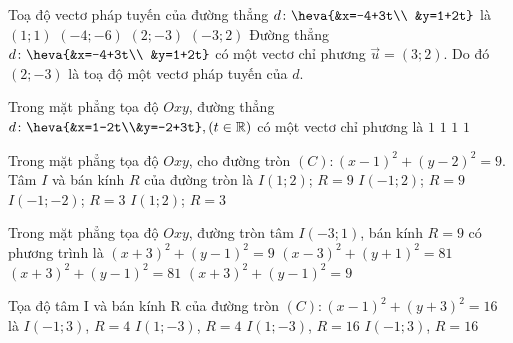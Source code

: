 \begin{ex}%
Toạ độ vectơ pháp tuyến của đường thẳng $d\colon \heva{&x=-4+3t\\ &y=1+2t}$ là
\choice
{$(1;1)$}
{$(-4;-6)$}
{\True $(2;-3)$}
{$(-3;2)$}
\loigiai
{
Đường thẳng $d\colon \heva{&x=-4+3t\\ &y=1+2t}$ có một vectơ chỉ phương $\vec{u}=(3;2)$. Do đó $(2;-3)$ là toạ độ một vectơ pháp tuyến của $d$.
}
\end{ex}

\begin{ex}%
Trong mặt phẳng tọa độ $Oxy$, đường thẳng $d\colon \heva{&x=1-2t\\&y=-2+3t},(t \in \mathbb{R})$ có một vectơ chỉ phương là
\choice
{$1$}
{\True $1$}
{$1$}
{$1$}
\end{ex}

\begin{ex}%
Trong mặt phẳng tọa độ $Oxy$, cho đường tròn $(C)\colon (x-1)^2+(y-2)^2=9$. Tâm $I$ và bán kính $R$ của đường tròn là
\choice
{$I(1;2)$; $R=9$}
{$I(-1;2)$; $R=9$}
{$I(-1;-2)$; $R=3$}
{\True $I(1;2)$; $R=3$}
\end{ex}

\begin{ex}%
Trong mặt phẳng tọa độ $Oxy$, đường tròn tâm $I\left(-3;1\right)$, bán kính $R=9$ có phương trình là
\choice
{$\left(x+3\right)^2+\left(y-1\right)^2=9$}
{$\left(x-3\right)^2+\left(y+1\right)^2=81$}
{\True $\left(x+3\right)^2+\left(y-1\right)^2=81$}
{$\left(x+3\right)^2+\left(y-1\right)^2=9$}
\end{ex}

\begin{ex}%
Tọa độ tâm I và bán kính R của đường tròn $(C)\colon {\left(x-1\right)^2}+\left(y+3\right)^2=16$ là
\choice
{$I\left(-1;3\right)$, $R=4$}
{\True $I\left(1;-3\right)$, $R=4$}
{$I\left(1;-3\right)$, $R=16$}
{$I\left(-1;3\right)$, $R=16$}
\end{ex}

